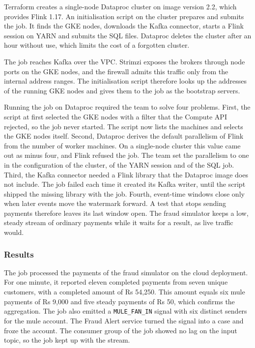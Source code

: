 \documentclass[11pt,a4paper]{article}
\newcommand{\code}[1]{\texttt{#1}}
\begin{document}
Terraform creates a single-node Dataproc cluster on image version 2.2, which provides Flink 1.17. An initialisation script on the cluster prepares and submits the job. It finds the GKE nodes, downloads the Kafka connector, starts a Flink session on YARN and submits the SQL files. Dataproc deletes the cluster after an hour without use, which limits the cost of a forgotten cluster.

The job reaches Kafka over the VPC. Strimzi exposes the brokers through node ports on the GKE nodes, and the firewall admits this traffic only from the internal address ranges. The initialisation script therefore looks up the addresses of the running GKE nodes and gives them to the job as the bootstrap servers.

Running the job on Dataproc required the team to solve four problems. First, the script at first selected the GKE nodes with a filter that the Compute API rejected, so the job never started. The script now lists the machines and selects the GKE nodes itself. Second, Dataproc derives the default parallelism of Flink from the number of worker machines. On a single-node cluster this value came out as minus four, and Flink refused the job. The team set the parallelism to one in the configuration of the cluster, of the YARN session and of the SQL job. Third, the Kafka connector needed a Flink library that the Dataproc image does not include. The job failed each time it created its Kafka writer, until the script shipped the missing library with the job. Fourth, event-time windows close only when later events move the watermark forward. A test that stops sending payments therefore leaves its last window open. The fraud simulator keeps a low, steady stream of ordinary payments while it waits for a result, as live traffic would.

\subsubsection{Results}

The job processed the payments of the fraud simulator on the cloud deployment. For one minute, it reported eleven completed payments from seven unique customers, with a completed amount of Rs 54,250. This amount equals six mule payments of Rs 9,000 and five steady payments of Rs 50, which confirms the aggregation. The job also emitted a \code{MULE\_FAN\_IN} signal with six distinct senders for the mule account. The Fraud Alert service turned the signal into a case and froze the account. The consumer group of the job showed no lag on the input topic, so the job kept up with the stream.
\end{document}
